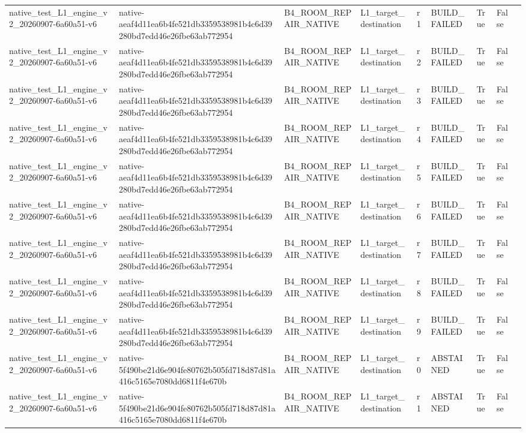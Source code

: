 \begin{tabular}{lllllllll}
native\_test\_L1\_engine\_v2\_20260907-6a60a51-v6 & native-aeaf4d11ea6b4fe521db3359538981b4c6d39280bd7edd46e26fbe63ab772954 & B4\_ROOM\_REPAIR\_NATIVE & L1\_target\_destination & r1 & BUILD\_FAILED & True & False &  \\
native\_test\_L1\_engine\_v2\_20260907-6a60a51-v6 & native-aeaf4d11ea6b4fe521db3359538981b4c6d39280bd7edd46e26fbe63ab772954 & B4\_ROOM\_REPAIR\_NATIVE & L1\_target\_destination & r2 & BUILD\_FAILED & True & False &  \\
native\_test\_L1\_engine\_v2\_20260907-6a60a51-v6 & native-aeaf4d11ea6b4fe521db3359538981b4c6d39280bd7edd46e26fbe63ab772954 & B4\_ROOM\_REPAIR\_NATIVE & L1\_target\_destination & r3 & BUILD\_FAILED & True & False &  \\
native\_test\_L1\_engine\_v2\_20260907-6a60a51-v6 & native-aeaf4d11ea6b4fe521db3359538981b4c6d39280bd7edd46e26fbe63ab772954 & B4\_ROOM\_REPAIR\_NATIVE & L1\_target\_destination & r4 & BUILD\_FAILED & True & False &  \\
native\_test\_L1\_engine\_v2\_20260907-6a60a51-v6 & native-aeaf4d11ea6b4fe521db3359538981b4c6d39280bd7edd46e26fbe63ab772954 & B4\_ROOM\_REPAIR\_NATIVE & L1\_target\_destination & r5 & BUILD\_FAILED & True & False &  \\
native\_test\_L1\_engine\_v2\_20260907-6a60a51-v6 & native-aeaf4d11ea6b4fe521db3359538981b4c6d39280bd7edd46e26fbe63ab772954 & B4\_ROOM\_REPAIR\_NATIVE & L1\_target\_destination & r6 & BUILD\_FAILED & True & False &  \\
native\_test\_L1\_engine\_v2\_20260907-6a60a51-v6 & native-aeaf4d11ea6b4fe521db3359538981b4c6d39280bd7edd46e26fbe63ab772954 & B4\_ROOM\_REPAIR\_NATIVE & L1\_target\_destination & r7 & BUILD\_FAILED & True & False &  \\
native\_test\_L1\_engine\_v2\_20260907-6a60a51-v6 & native-aeaf4d11ea6b4fe521db3359538981b4c6d39280bd7edd46e26fbe63ab772954 & B4\_ROOM\_REPAIR\_NATIVE & L1\_target\_destination & r8 & BUILD\_FAILED & True & False &  \\
native\_test\_L1\_engine\_v2\_20260907-6a60a51-v6 & native-aeaf4d11ea6b4fe521db3359538981b4c6d39280bd7edd46e26fbe63ab772954 & B4\_ROOM\_REPAIR\_NATIVE & L1\_target\_destination & r9 & BUILD\_FAILED & True & False &  \\
native\_test\_L1\_engine\_v2\_20260907-6a60a51-v6 & native-5f490be21d6e904fe80762b505fd718d87d81a416c5165e7080dd6811f4e670b & B4\_ROOM\_REPAIR\_NATIVE & L1\_target\_destination & r0 & ABSTAINED & True & False &  \\
native\_test\_L1\_engine\_v2\_20260907-6a60a51-v6 & native-5f490be21d6e904fe80762b505fd718d87d81a416c5165e7080dd6811f4e670b & B4\_ROOM\_REPAIR\_NATIVE & L1\_target\_destination & r1 & ABSTAINED & True & False &  \\

\end{tabular}
